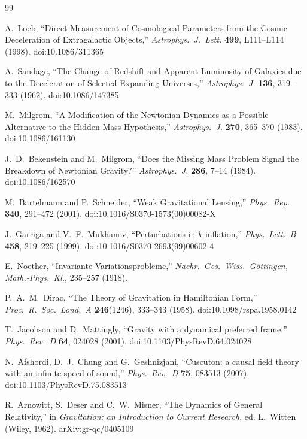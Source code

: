 \documentclass[12pt]{article}
\begin{document}
\begin{thebibliography}{99}

A.~Loeb,
``Direct Measurement of Cosmological Parameters from the Cosmic Deceleration of Extragalactic Objects,''
\textit{Astrophys.\ J.\ Lett.} \textbf{499}, L111--L114 (1998).
doi:10.1086/311365

A.~Sandage,
``The Change of Redshift and Apparent Luminosity of Galaxies due to the Deceleration of Selected Expanding Universes,''
\textit{Astrophys.\ J.} \textbf{136}, 319--333 (1962).
doi:10.1086/147385

M.~Milgrom,
``A Modification of the Newtonian Dynamics as a Possible Alternative to the Hidden Mass Hypothesis,''
\textit{Astrophys.\ J.} \textbf{270}, 365--370 (1983).
doi:10.1086/161130

J.~D.~Bekenstein and M.~Milgrom,
``Does the Missing Mass Problem Signal the Breakdown of Newtonian Gravity?''
\textit{Astrophys.\ J.} \textbf{286}, 7--14 (1984).
doi:10.1086/162570

M.~Bartelmann and P.~Schneider,
``Weak Gravitational Lensing,''
\textit{Phys.\ Rep.} \textbf{340}, 291--472 (2001).
doi:10.1016/S0370-1573(00)00082-X

J.~Garriga and V.~F.~Mukhanov,
``Perturbations in $k$-inflation,''
\textit{Phys.\ Lett.\ B} \textbf{458}, 219--225 (1999).
doi:10.1016/S0370-2693(99)00602-4

E.~Noether,
``Invariante Variationsprobleme,''
\textit{Nachr.\ Ges.\ Wiss.\ G\"ottingen, Math.-Phys.\ Kl.}, 235--257 (1918).

P.~A.~M.~Dirac,
``The Theory of Gravitation in Hamiltonian Form,''
\textit{Proc.\ R.\ Soc.\ Lond.\ A} \textbf{246}(1246), 333--343 (1958).
doi:10.1098/rspa.1958.0142

T.~Jacobson and D.~Mattingly,
``Gravity with a dynamical preferred frame,''
\textit{Phys.\ Rev.\ D} \textbf{64}, 024028 (2001).
doi:10.1103/PhysRevD.64.024028

N.~Afshordi, D.~J.~Chung and G.~Geshnizjani,
``Cuscuton: a causal field theory with an infinite speed of sound,''
\textit{Phys.\ Rev.\ D} \textbf{75}, 083513 (2007).
doi:10.1103/PhysRevD.75.083513

R.~Arnowitt, S.~Deser and C.~W.~Misner,
``The Dynamics of General Relativity,''
in \textit{Gravitation: an Introduction to Current Research}, ed. L.~Witten (Wiley, 1962).
arXiv:gr-qc/0405109


\end{thebibliography}
\end{document}
